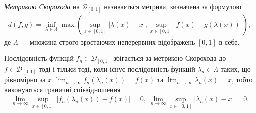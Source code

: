 \begin{definition}
    \emph{Метрикою Скорохода} на $\mathcal{D}_{[0, 1]}$ називається метрика, визначена за формулою
    \begin{gather*}
        d(f, g) = \inf_{\lambda \in \Lambda} \max \left(
            \sup_{x \in [0, 1]} \left|\lambda(x) - x\right|, 
            \sup_{x \in [0, 1]} \left|f(x) - g(\lambda(x))\right|
        \right),
    \end{gather*}
    де $\Lambda$ --- множина строго зростаючих неперервних відображень
    $[0, 1]$ в себе.

    Послідовність функцій $f_n \in \mathcal{D}_{[0, 1]}$ збігається за метрикою Скорохода до $f \in \mathcal{D}_{[0, 1]}$
    тоді і тільки тоді, коли існує послідовність функцій $\lambda_n \in \Lambda$ таких, що
    рівномірно за $x$
    $\lim_{n\to\infty} f_n \left(\lambda_n(x)\right) = f(x)$ та
    $\lim_{n\to\infty} \lambda_n(x) = x$, тобто
    виконуються граничні співвідношення
    \begin{gather*}
        \lim_{n\to\infty} \sup_{x\in[0, 1]}\left| f_n \left(\lambda_n(x)\right) - f(x) \right| = 0, \;
        \lim_{n\to\infty} \sup_{x\in[0, 1]}\left| \lambda_n(x) - x \right| = 0.
    \end{gather*}
\end{definition}